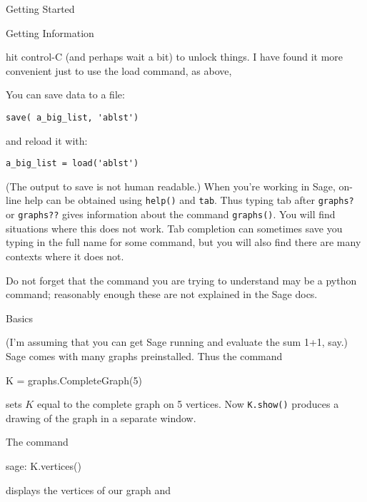 \begin{chap}{Getting Started}
\begin{sect}{Getting Information}
\begin{para}
hit control-C (and perhaps wait a bit) to unlock things.  I have found it more
convenient just to use the load command, as above,
\end{para}
%
\begin{para}
You can save data to a file:
\end{para}
%
\begin{verbatim}
save( a_big_list, 'ablst')
\end{verbatim}
%
\begin{para}
and reload it with: 
\end{para}
%
\begin{verbatim}
a_big_list = load('ablst')
\end{verbatim}
%
\begin{para}
(The output to save is not human readable.)             
When you're working in Sage, on-line help can be obtained using \texttt{help()} 
and \texttt{tab}. Thus typing tab after \texttt{graphs?} or \texttt{graphs??} gives 
information about the command \texttt{graphs()}.  You will find situations where this
does not work.  Tab completion can sometimes save you typing in the full name for
some command, but you will also find there are many contexts where it does not.
\end{para}
%
\begin{para}
Do not forget that the command you are trying to understand may be a python
command; reasonably enough these are not explained in the Sage docs.
\end{para}
%
\end{sect}
%
\begin{sect}{Basics}
%
\begin{para}
(I'm assuming that you can get Sage running and evaluate the sum 1+1, say.)
Sage comes with many graphs preinstalled.  Thus the command
\end{para}
%
\begin{sageblock}
K = graphs.CompleteGraph(5)
\end{sageblock}
%
\begin{para}
sets $K$ equal to the complete graph on 5 vertices.  Now 
\verb|K.show()| produces a drawing of the graph in a separate window. 
\end{para}
%
\begin{para}
The command
\end{para}
%
\begin{sageexample}
    sage: K.vertices()
\end{sageexample}
displays the vertices of our graph and
\begin{sageexample}

\end{sageexample}
\end{sect}
\end{chap}
